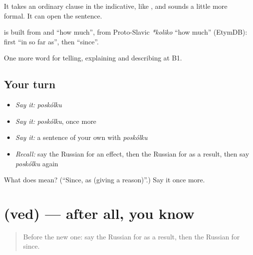 It takes an ordinary clause in the indicative, like \emph{ }, and sounds a little more formal. It can open the sentence.

\begin{cousinweb}
\textbf{} is built from \emph{} and \emph{} \textquotedblleft{}how much\textquotedblright{}, from Proto-Slavic \emph{*koliko} \textquotedblleft{}how much\textquotedblright{} (EtymDB): first \textquotedblleft{}in so far as\textquotedblright{}, then \textquotedblleft{}since\textquotedblright{}.
\end{cousinweb}

\begin{grammarlens}[title={What you've built}]
One more word for telling, explaining and describing at B1.
\end{grammarlens}

\subsection*{Your turn}
\begin{itemize}
\raggedright
  \item \emph{Say it:} \emph{poskólku}
  \item \emph{Say it:} \emph{poskólku}, once more
  \item \emph{Say it:} a sentence of your own with \emph{poskólku}
  \item \emph{Recall:} say the Russian for an effect, then the Russian for as a result, then say \emph{poskólku} again
\end{itemize}

\begin{tcolorbox}[breakable,colback=teal!4,colframe=teal!35!black,title={Before you move on}]
What does  mean? (\textquotedblleft{}Since, as (giving a reason)\textquotedblright{}.) Say it once more.
\end{tcolorbox}
\section[\texorpdfstring{\ru{ведь} (ved)}{ведь (ved)}]{ (ved) — after all, you know}

\label{lesson:RU-C351-ved}



\begin{quote}
Before the new one: say the Russian for as a result, then the Russian for since.
\end{quote}

